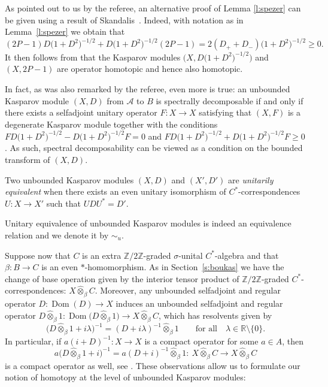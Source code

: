 \documentclass[pdftex]{sigma}
\numberwithin{equation}{section}
\newcommand{\hot}{\widehat \otimes}
\newcommand{\zz}{\mathbb{Z}}
\newcommand{\rr}{\mathbb{R}}
\newcommand{\be}{\beta}
\newcommand{\la}{\lambda}
\newcommand{\si}{\sigma}
\newcommand{\s}[1]{\mathscr{#1}}
\newcommand{\sem}{\setminus}
\begin{document}
\begin{rem}As pointed out to us by the referee, an alternative proof of Lemma \ref{l:spezer} can be given using a result of Skandalis~\cite[Lemma~11]{Ska:SRK}. Indeed, with notation as in Lemma~\ref{l:spezer} we obtain that
\[
(2P-1) D\big(1 + D^2\big)^{-1/2} + D\big(1 + D^2\big)^{-1/2} (2P-1) = 2(D_+ + D_-)\big(1 + D^2\big)^{-1/2} \geq 0 .
\]
It then follows from \cite[Lemma~11]{Ska:SRK} that the Kasparov modules $\big(X,D\big(1 + D^2\big)^{-1/2}\big)$ and \mbox{$(X,2P-1)$} are operator homotopic and hence also homotopic.

In fact, as was also remarked by the referee, even more is true: an unbounded Kasparov module $(X,D)$ from $\s A$ to $B$ is spectrally decomposable if and only if there exists a selfadjoint unitary operator $F\colon X \to X$ satisfying that $(X,F)$ is a degenerate Kasparov module together with the conditions $F D\big(1+D^2\big)^{-1/2} - D\big(1+D^2\big)^{-1/2} F = 0$ and $F D\big(1+D^2\big)^{-1/2} + D\big(1+D^2\big)^{-1/2} F \geq 0$. As such, spectral decomposability can be viewed as a condition on the bounded transform of $(X,D)$.
\end{rem}

\begin{dfn}Two unbounded Kasparov modules $(X,D)$ and $(X',D')$ are \emph{unitarily equivalent} when there exists an even unitary isomorphism of $C^*$-correspondences $U\colon X \to X'$ such that $U D U^* = D'$.
\end{dfn}

Unitary equivalence of unbounded Kasparov modules is indeed an equivalence relation and we denote it by $\sim_u$.

Suppose now that $C$ is an extra $\zz/2\zz$-graded $\si$-unital $C^*$-algebra and that $\be\colon B \to C$ is an even $*$-homomorphism. As in Section~\ref{s:boukas} we have the change of base operation given by the interior tensor product of $\zz/2\zz$-graded $C^*$-correspondences: $X \hot_\be C$. Moreover, any unbounded selfadjoint and regular operator $D\colon \operatorname{Dom}(D) \to X$ induces an unbounded selfadjoint and regular operator $D \hot_\be 1\colon \operatorname{Dom}\big(D \hot_\be 1\big) \to X \hot_\be C$, which has resolvents given by
\[
\big( D \hot_\be 1 + i \la \big)^{-1} = (D + i \la)^{-1} \hot_\be 1 \qquad \text{for all} \quad \la \in \rr \sem \{0\} .
\]
In particular, if $a (i + D)^{-1}\colon X \to X$ is a compact operator for some $a \in A$, then
\[
a \big(D \hot_\be 1 + i\big)^{-1} = a (D + i)^{-1} \hot_\be 1\colon \ X \hot_\be C \to X \hot_\be C
\]
is a compact operator as well, see \cite[Proposition~4.7]{Lan:HCM}. These observations allow us to formulate our notion of homotopy at the level of unbounded Kasparov modules:
\end{document}
